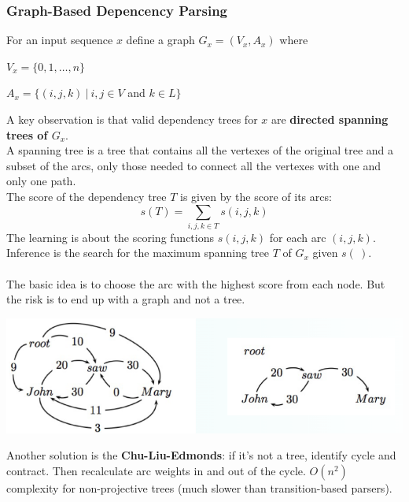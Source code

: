 \documentclass[10pt]{report}
\begin{document}
\subsubsection{Graph-Based Depencency Parsing}
For an input sequence $x$ define a graph $G_x=(V_x, A_x)$ where\begin{list}{}{}
	\item $V_x=\{0,1,\ldots,n\}$
	\item $A_x=\{(i,j,k)\:|\:i,j\in V$ and $k \in L\}$
\end{list}
A key observation is that valid dependency trees for $x$ are \textbf{directed spanning trees of $G_x$}.\\
A spanning tree is a tree that contains all the vertexes of the original tree and a subset of the arcs, only those needed to connect all the vertexes with one and only one path.\\
The score of the dependency tree $T$ is given by the score of its arcs:
$$s(T)=\sum_{i,j,k\in T} s(i,j,k)$$
The learning is about the scoring functions $s(i,j,k)$ for each arc $(i,j,k)$. Inference is the search for the maximum spanning tree $T$ of $G_x$ given $s(\:)$.\\\\
The basic idea is to choose the arc with the highest score from each node. But the risk is to end up with a graph and not a tree.
\begin{center}
	\includegraphics[scale=0.33]{45.png}
\end{center}
Another solution is the \textbf{Chu-Liu-Edmonds}: if it's not a tree, identify cycle and contract. Then recalculate arc weights in and out of the cycle. $O(n^2)$ complexity for non-projective trees (much slower than transition-based parsers).
\end{document}

